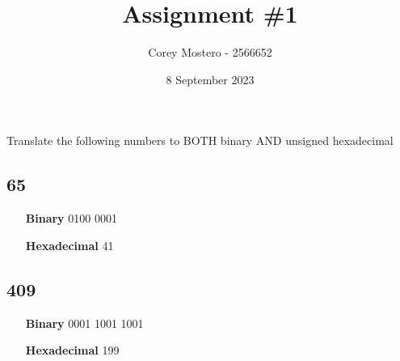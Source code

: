 \documentclass{article}
\title{Assignment \#1}
\author{Corey Mostero - 2566652}
\date{8 September 2023}
\begin{document}
\newcommand{\hr}{\par\noindent\rule{\textwidth}{0.4pt}}

\newcommand{\bc}[1]{
	\begin{equation*}
		\begin{boxed}
			{#1}
		\end{boxed}
	\end{equation*}
}

\newcommand{\cond}[2]{
	\ifmmode
		{#1} \quad {#2}
	\else
		$$ {#1} \quad {#2} $$
	\fi
}

\newcommand{\matr}[1]{
	\ifmmode \bm{#1}
	\else \textit{\textbf{#1}}
	\fi
}
\newcommand{\vect}[1]{
	\ifmmode \mathbf{#1}
	\else \textbf{#1}
	\fi
}


\maketitle
\newpage

\tableofcontents

\section{}
Translate the following numbers to BOTH binary AND unsigned hexadecimal

\subsection{65}
\begin{itemize}
	\item[\textbf{Binary}] 0100 0001
	\item[\textbf{Hexadecimal}] 41
\end{itemize}

\subsection{409}
\begin{itemize}
	\item[\textbf{Binary}] 0001 1001 1001
	\item[\textbf{Hexadecimal}] 199
\end{itemize}
\end{document}
